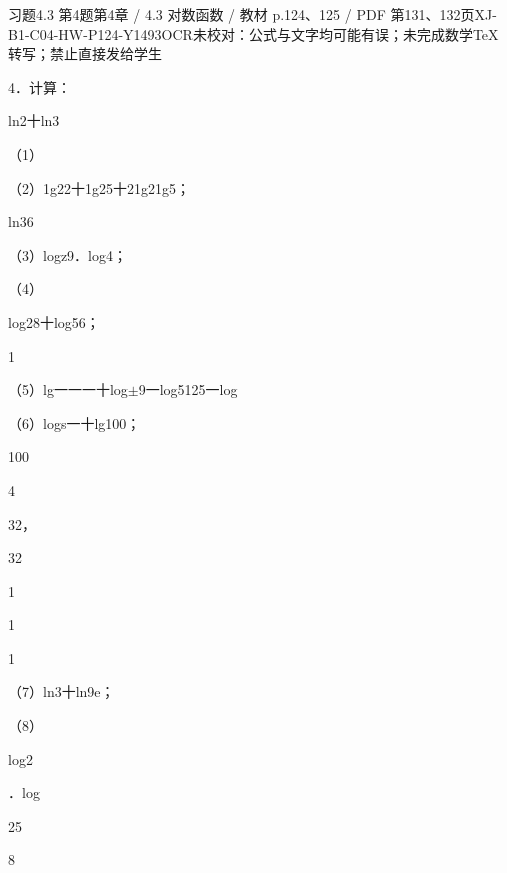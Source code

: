 \begin{bankitem}{习题4.3 第4题}{第4章 / 4.3 对数函数 / 教材 p.124、125 / PDF 第131、132页}{XJ-B1-C04-HW-P124-Y1493}{OCR未校对：公式与文字均可能有误；未完成数学TeX转写；禁止直接发给学生}
\begin{ocrdraft}
\par
4．计算：
\par
ln2十ln3
\par
（1）
\par
（2）1g22十1g25十21g21g5；
\par
ln36
\par
[教材p.125 / PDF第132页]
\par
（3）logz9．log4；
\par
（4）
\par
log28十log56；
\par
1
\par
（5）lg一一一十log\ensuremath{\pm}9一log5125一log
\par
（6）logs一十lg100；
\par
100
\par
4
\par
32，
\par
32
\par
1
\par
1
\par
1
\par
（7）ln3十ln9e；
\par
（8）
\par
log2
\par
．log
\par
25
\par
8
\end{ocrdraft}
\end{bankitem}
